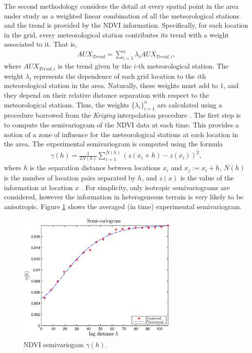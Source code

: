 \documentclass[10pt,letterpaper,conference]{ieeeconf}
\begin{document}
The second methodology considers 
the detail at every spatial point in the area under study as a weighted linear 
combination of all the meteorological stations and the trend is provided by the 
NDVI information. Specifically, for each location in the grid, every 
meteorological station contributes its trend with a weight associated to it. 
That is,
\begin{align*}
AUX_{Trend} = \sum_{i=1}^n \lambda_i AUX_{Trend,i},
\end{align*}
where $AUX_{Trend,i}$ is the trend given by the $i$-th meteorological station. 
The weight $\lambda_i$ represents the dependence of each grid location 
 to the $i$th meteorological station in the area. Naturally, these weights 
must add to $1$, and they depend on their relative distance separation with 
respect to the meteorological stations. Thus, the weights 
$\{\lambda_i\}_{i=1}^{n}$ are calculated using a procedure borrowed from the 
\emph{Kriging} interpolation procedure 
\cite{Cressie_91,Goovaerts_97,Matheron_65}. The first step is to compute the 
semivariogram of the NDVI data at each time. This provides a notion of a zone 
of influence for the meteorological stations at  
each location in the area. The experimental semivariogram is computed using the 
formula
\begin{align*}
 \gamma(h) = \frac{1}{2 N(h)}\sum_{i=1}^{N(h)} (z(x_i+h) - z(x_i))^2, 
\end{align*}
where $h$ is the separation distance between locations $x_i$ and $x_j:=x_i+h$, 
$N(h)$ is the number of location pairs separated by $h$, and $z(x)$ is the 
value of the information at location $x$ \cite{Cressie_91}. For simplicity, 
only isotropic semivariograms are considered, however the information in 
heterogeneous terrain is very likely to be anisotropic. Figure 
\ref{fig:semivariance} shows the averaged (in time) experimental semivariogram. 
\begin{figure}[ht]
\begce
\includegraphics[width=8cm]{SemivariogramNDVI225x225}
\endce
\caption{NDVI semivariogam $\gamma(h)$.}
\label{fig:semivariance}
\end{figure}
\end{document}

